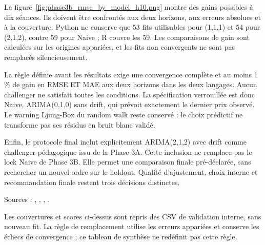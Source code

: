 La figure~\ref{fig:phase3b_rmse_by_model_h10.png} montre des gains possibles à dix séances. Ils doivent être confrontés aux deux horizons, aux erreurs absolues et à la couverture. Python ne conserve que 53 fits utilisables pour (1,1,1) et 54 pour (2,1,2), contre 59 pour Naive ; R couvre les 59. Les comparaisons de gain sont calculées sur les origines appariées, et les fits non convergents ne sont pas remplacés silencieusement.



La règle définie avant les résultats exige une convergence complète et au moins 1 \% de gain en RMSE ET MAE aux deux horizons dans les deux langages. Aucun challenger ne satisfait toutes les conditions. La spécification verrouillée est donc Naive, ARIMA(0,1,0) sans drift, qui prévoit exactement le dernier prix observé. Le warning Ljung-Box du random walk reste conservé : le choix prédictif ne transforme pas ses résidus en bruit blanc validé.



Enfin, le protocole final inclut explicitement ARIMA(2,1,2) avec drift comme challenger pédagogique issu de la Phase 3A. Cette inclusion ne remplace pas le lock Naive de Phase 3B. Elle permet une comparaison finale pré-déclarée, sans rechercher un nouvel ordre sur le holdout. Qualité d’ajustement, choix interne et recommandation finale restent trois décisions distinctes.



Sources : , , , .


Les couvertures et scores ci-dessus sont repris des CSV de validation interne, sans nouveau fit. La règle de remplacement utilise les erreurs appariées et conserve les échecs de convergence ; ce tableau de synthèse ne redéfinit pas cette règle.
